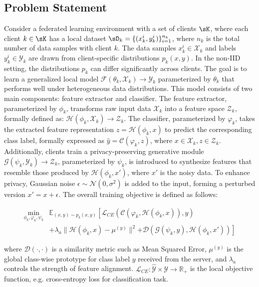 \documentclass[lettersize,journal]{IEEEtran}
\begin{document}
\subsection{Problem Statement}
\bgroup
Consider a federated learning environment with a set of clients $\displaystyle \sK$, where each client $k \in \displaystyle \sK$ has a local dataset $\displaystyle \sD_k = \{(x^i_{k}, y^i_{k})\}_{i=1}^{n_k}$, where $n_k$ is the total number of data samples with client $k$. The data samples $x^i_{k} \in \mathcal{X}_k$ and labels $y^i_{k} \in \mathcal{Y}_k$ are drawn from client-specific distributions $p_k(x, y)$. In the non-IID setting, the distributions $p_k$ can differ significantly across clients. The goal is to learn a generalized local model $\mathcal{F}(\theta_k, \mathcal{X}_k) \rightarrow \mathcal{Y}_k$ parameterized by $\theta_k$ that performs well under heterogeneous data distributions. This model consists of two main components: feature extractor and classifier. The feature extractor, parameterized by $\phi_k$,  transforms raw input data $\mathcal{X}_k$ into a feature space $\mathcal{Z}_k$, formally defined as: $\mathcal{H}(\phi_k, \mathcal{X}_k)\rightarrow \mathcal{Z}_k$. The classifier, parameterized by $\varphi_k$, takes the extracted feature representation $z=\mathcal{H}(\phi_k, x)$ to predict the corresponding class label, formally expressed as $ \hat{y} = \mathcal{C}(\varphi_k, z)$, where $x  \in \mathcal{X}_k, z \in \mathcal{Z}_k$. 
Additionally, clients train a privacy-preserving generative module $\mathcal{G}(\psi_k, \mathcal{Y}_k) \rightarrow \mathcal{Z}_k$, parameterized by $\psi_k$, is introduced to synthesize features that resemble those produced by $\mathcal{H}(\phi_k, x')$, where $x'$ is the noisy data. To enhance privacy, Gaussian noise $\epsilon \sim \mathcal{N}(0, \sigma^2)$ is added to the input, forming a perturbed version $x' = x + \epsilon$. The overall training objective is defined as follows:

\begin{align}
    \min_{\phi_k, \varphi_k, \psi_k} & \mathbb{E}_{(x, y) \sim p_k(x, y)} \left[ \mathcal{L}_{CE}(\mathcal{C}(\varphi_k, \mathcal{H}(\phi_k, x)), y) \right. \\ \nonumber
    & + \lambda_a \| \mathcal{H}(\phi_k, x) - \mu^{(y)} \|^2  \left. + \mathcal{D} (\mathcal{G}(\psi_k, y), \mathcal{H}(\phi_k, x')) \right]
\end{align}

where $\mathcal{D}(\cdot, \cdot)$ is a similarity metric such as Mean Squared Error, $\mu^{(y)}$ is the global class-wise prototype for class label $y$ received from the server, and $\lambda_a$ controls the strength of feature alignment.
 $\mathcal{L}_{CE}: \hat{\mathcal{Y}} \times \mathcal{Y} \rightarrow \mathbb{R}_+$ is the local objective function, e.g. cross-entropy loss for classification task.
\end{document}
